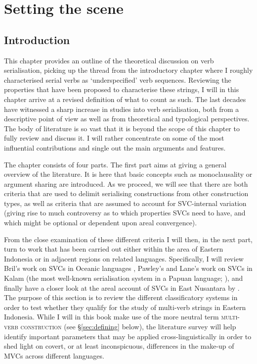 \chapter{Setting the scene}\label{ch:theory}
\section{Introduction}
This chapter provides an outline of the theoretical discussion on verb serialisation, picking up the thread from the introductory chapter where I roughly characterised serial verbs as `underspecified' verb sequences. Reviewing the properties that have been proposed to characterise these strings, I will in this chapter arrive at a revised definition of what to count as such. The last decades have witnessed a sharp increase in studies into verb serialisation, both from a descriptive point of view as well as from theoretical and typological perspectives. The body of literature is so vast that it is beyond the scope of this chapter to fully review and discuss it. I will rather concentrate on some of the most influential contributions and single out the main arguments and features.

The chapter consists of four parts. The first part aims at giving a general overview of the literature. It is here that basic concepts such as monoclausality or argument sharing are introduced. As we proceed, we will see that there are both criteria that are used to delimit serialising constructions from other construction types, as well as criteria that are assumed to account for SVC-internal variation (giving rise to much controversy as to which properties SVCs need to have, and which might be optional or dependent upon areal convergence). 

From the close examination of these different criteria I will then, in the next part, turn to work that has been carried out either within the area of Eastern Indonesia or in adjacent regions on related languages. Specifically, I will review Bril's work on SVCs in Oceanic languages \citep{bril2004complex,bril2007nexus}, Pawley's and Lane's work on SVCs in Kalam (the most well-known serialisation system in a Papuan language; \citealt{Pawley1987, pawley2011event, lane2008kalam}), and finally have a closer look at the areal account of SVCs in East Nusantara by \citet{vanstaden2008serial}. The purpose of this section is to review the different classificatory systems in order to test whether they qualify for the study of multi-verb strings in Eastern Indonesia. While I will in this book make use of the more neutral term \textsc{multi-verb construction} (see §\ref{sec:defining} below), the literature survey will help identify important parameters that may be applied cross-linguistically in order to shed light on covert, or at least inconspicuous, differences in the make-up of MVCs across different languages.

